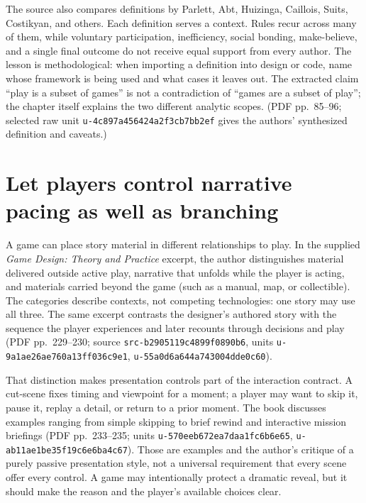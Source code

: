 The source also compares definitions by Parlett, Abt, Huizinga, Caillois, Suits, Costikyan, and others. Each definition serves a context. Rules recur across many of them, while voluntary participation, inefficiency, social bonding, make-believe, and a single final outcome do not receive equal support from every author. The lesson is methodological: when importing a definition into design or code, name whose framework is being used and what cases it leaves out. The extracted claim ``play is a subset of games'' is not a contradiction of ``games are a subset of play''; the chapter itself explains the two different analytic scopes. (PDF pp.~85--96; selected raw unit \texttt{u-4c897a456424a2f3cb7bb2ef} gives the authors' synthesized definition and caveats.)

\section{Let players control narrative pacing as well as branching}\label{06-engine-ii-ch047-let-players-control-narrative-pacing-as-well-as-branching}

A game can place story material in different relationships to play. In the supplied \emph{Game Design: Theory and Practice} excerpt, the author distinguishes material delivered outside active play, narrative that unfolds while the player is acting, and materials carried beyond the game (such as a manual, map, or collectible). The categories describe contexts, not competing technologies: one story may use all three. The same excerpt contrasts the designer's authored story with the sequence the player experiences and later recounts through decisions and play (PDF pp.~229--230; source \texttt{src-b2905119c4899f0890b6}, units \texttt{u-9a1ae26ae760a13ff036c9e1}, \texttt{u-55a0d6a644a743004dde0c60}).

That distinction makes presentation controls part of the interaction contract. A cut-scene fixes timing and viewpoint for a moment; a player may want to skip it, pause it, replay a detail, or return to a prior moment. The book discusses examples ranging from simple skipping to brief rewind and interactive mission briefings (PDF pp.~233--235; units \texttt{u-570eeb672ea7daa1fc6b6e65}, \texttt{u-ab11ae1be35f19c6e6ba4c67}). Those are examples and the author's critique of a purely passive presentation style, not a universal requirement that every scene offer every control. A game may intentionally protect a dramatic reveal, but it should make the reason and the player's available choices clear.

